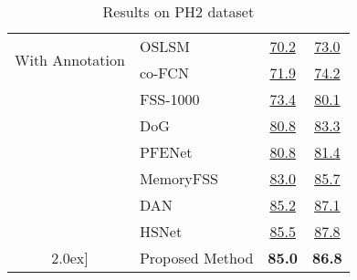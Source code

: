 \documentclass[runningheads]{llncs}
\begin{document}
\begin{table}[!htb]
\begin{subtable}[b]{0.54\textwidth}
{\begin{tabular}{cl|cc}
				\midrule
				\multirow{2}{*}{With Annotation}      
                    & OSLSM~\cite{shaban2017one} & \underline{70.2} & \underline{73.0} \\
                    & co-FCN~\cite{rakelly2018conditional} & \underline{71.9} & \underline{74.2} \\
                    & FSS-1000~\cite{li2020fss} & \underline{73.4}& \underline{80.1} \\
                    & DoG~\cite{azad2021texture} & \underline{80.8} & \underline{83.3} \\
                    & PFENet~\cite{tian2020prior} & \underline{80.8} & \underline{81.4} \\
                    & MemoryFSS~\cite{lu2021learning} & \underline{83.0} & \underline{85.7} \\
                    & DAN~\cite{wang2020few} & \underline{85.2} & \underline{87.1} \\  & HSNet~\cite{min2021hypercorrelation} & \underline{85.5} & \underline{87.8} \\ \cline{2-4} \-2.0ex]
				\rowcolor[rgb]{0.682,0.859,0.855}
				& Proposed Method  & \textbf{85.0} & \textbf{86.8} \\				
				\bottomrule
			\end{tabular}
		}
	\end{subtable}
	\hfill
	\begin{subtable}[c]{0.40\textwidth}
		\caption{Results on PH2 dataset} \label{tab:results2}
        \centering
\end{subtable}
\end{table}
\end{document}

